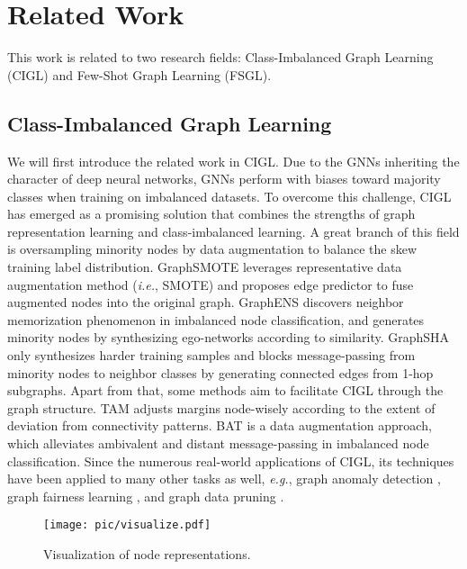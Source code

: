 \section{Related Work}
\label{sec:related}


This work is related to two research fields: Class-Imbalanced Graph Learning (CIGL) and Few-Shot Graph Learning (FSGL). 
\subsection{Class-Imbalanced Graph Learning}
We will first introduce the related work in CIGL. Due to the GNNs inheriting the character of deep neural networks, GNNs perform with biases toward majority classes when training on imbalanced datasets. To overcome this challenge, CIGL has emerged as a promising solution that combines the strengths of graph representation learning and class-imbalanced learning. A great branch of this field is oversampling minority nodes by data augmentation to balance the skew training label distribution. GraphSMOTE \cite{zhao2021graphsmote} leverages representative data augmentation method (\emph{i.e.}, SMOTE) and proposes edge predictor to fuse augmented nodes into the original graph. GraphENS \cite{park2021graphens} discovers neighbor memorization phenomenon in imbalanced node classification, and generates minority nodes by synthesizing ego-networks according to similarity. GraphSHA \cite{li2023graphsha} only synthesizes harder training samples and blocks message-passing from minority nodes to neighbor classes by generating connected edges from 1-hop subgraphs. Apart from that, some methods aim to facilitate CIGL through the graph structure. TAM \cite{song2022tam} adjusts margins node-wisely according to the extent of deviation from connectivity patterns. BAT \cite{liu2023topological} is a data augmentation approach, which alleviates ambivalent and distant message-passing in imbalanced node classification. Since the numerous real-world applications of CIGL, its techniques have been applied to many other tasks as well, \emph{e.g.}, graph anomaly detection \cite{zhou2023improving,ma2024graph}, graph fairness learning \cite{li2024rethinking}, and graph data pruning \cite{zhang2024gder}.

\begin{figure}[t]
\centering
\texttt{[image: pic/visualize.pdf]}
\caption{Visualization of node representations.}
\label{fig:visualization}
\end{figure}

